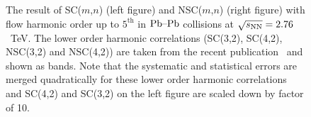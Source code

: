 \begin{figure}[h]
            \begin{center}
        \caption{The result of SC($m$,$n$) (left figure) and NSC($m$,$n$) (right figure) with flow harmonic order up to $5^{\mathrm{th}}$ in $\textnormal{Pb--Pb}$ collisions at $\sqrt{s_{\textnormal{NN}}}=2.76$~TeV. The lower order harmonic correlations (SC(3,2), SC(4,2), NSC(3,2) and NSC(4,2)) are taken from the recent publication~\cite{ALICE:2016kpq} and shown as bands. Note that the systematic and statistical errors are merged quadratically for these lower order harmonic correlations  and SC(4,2) and SC(3,2) on the left figure are scaled down by factor of 10.}
        \label{fig:Figure_1}
              \end{center}
\end{figure}

